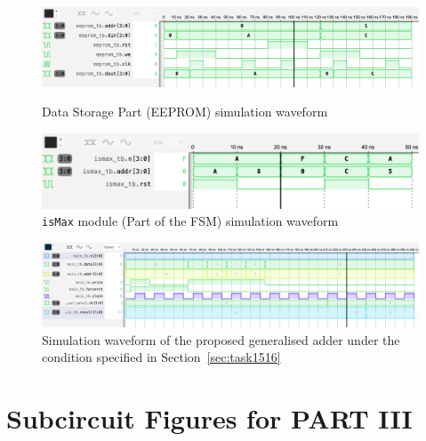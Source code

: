 \documentclass[11pt]{article}
\begin{document}
\begin{appendix}
\begin{figure}[h!]
	\centering
	\begin{minipage}{0.45\textwidth}
		\centering
		\includegraphics[width=\textwidth]{EEPROM_tb.png}
		\caption{Data Storage Part (EEPROM) simulation waveform}
		\label{fig:EEPROM_waveform}
	\end{minipage}
	\hfill
	\begin{minipage}{0.45\textwidth}
		\centering
		\includegraphics[width=\textwidth]{isMax_tb.png}
		\caption{\texttt{isMax} module (Part of the FSM) simulation waveform}
		\label{fig:isMax_waveform}
	\end{minipage}
\end{figure}

\begin{figure}[h!]
	\centering
	\includegraphics[width=\textwidth]{main_tb.png}
	\caption{Simulation waveform of the proposed generalised adder under the condition specified in Section~\ref{sec:task1516}}
	\label{fig:main_waveform}
\end{figure}

\clearpage
\section{Subcircuit Figures for PART III}
\label{app:subcircuitfigures}


\end{appendix}
\end{document}
